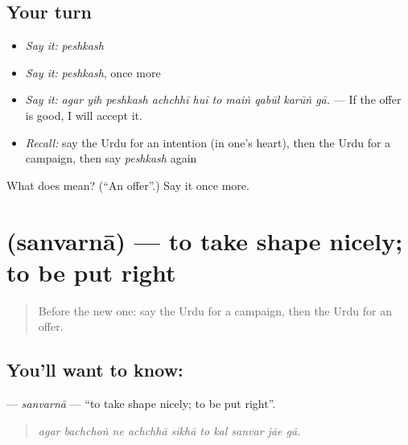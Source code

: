 \subsection*{Your turn}
\begin{itemize}
\raggedright
  \item \emph{Say it:} \emph{peshkash}
  \item \emph{Say it:} \emph{peshkash}, once more
  \item \emph{Say it:} \emph{agar yih peshkash achchhī huī to maiṅ qabūl karūṅ gā.} — If the offer is good, I will accept it.
  \item \emph{Recall:} say the Urdu for an intention (in one's heart), then the Urdu for a campaign, then say \emph{peshkash} again
\end{itemize}

\begin{tcolorbox}[breakable,colback=teal!4,colframe=teal!35!black,title={Before you move on}]
What does  mean? (\textquotedblleft{}An offer\textquotedblright{}.) Say it once more.
\end{tcolorbox}
\section[\texorpdfstring{\ur{سنورنا} (sanvarnā)}{سنورنا (sanvarnā)}]{ (sanvarnā) — to take shape nicely; to be put right}

\label{lesson:UR-C547-sanvarna-intr}



\begin{quote}
Before the new one: say the Urdu for a campaign, then the Urdu for an offer.
\end{quote}

\subsection*{You'll want to know: }
\textbf{} — \emph{sanvarnā} — \textquotedblleft{}to take shape nicely; to be put right\textquotedblright{}.

\begin{quote}
         
\end{quote}

\begin{quote}
\emph{agar bachchoṅ ne achchhā sīkhā to kal sanvar jāe gā.}
\end{quote}

